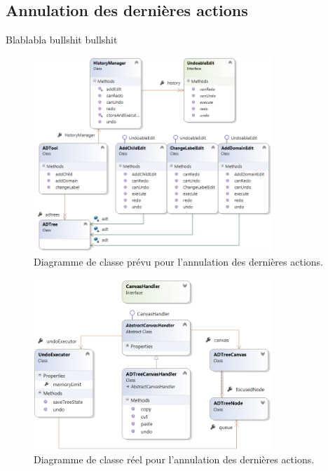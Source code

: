 	\subsection{Annulation des dernières actions}
		Blablabla bullshit bullshit
        \begin{figure}
            \centering
                \includegraphics[width=0.8\textwidth]{figure/ctrlz.png}
            \caption{Diagramme de classe prévu pour l'annulation des dernières actions.}
            \label{fig:ctrlzPrevu}
        \end{figure}
        
        \begin{figure}
            \centering
                \includegraphics[width=0.8\textwidth]{figure/ctrlzReel.png}
            \caption{Diagramme de classe réel pour l'annulation des dernières actions.}
            \label{fig:ctrlzReel}
        \end{figure}

